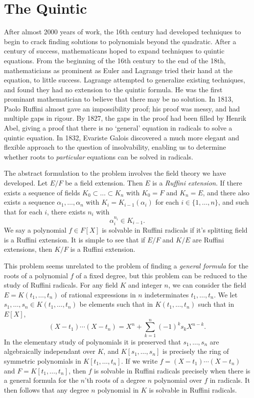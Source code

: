 \section{The Quintic}

After almost 2000 years of work, the 16th century had developed techniques to begin to crack finding solutions to polynomials beyond the quadratic. After a century of success, mathematicans hoped to expand techniques to quintic equations. From the beginning of the 16th century to the end of the 18th, mathematicians as prominent as Euler and Lagrange tried their hand at the equation, to little success. Lagrange attempted to generalize existing techniques, and found they had no extension to the quintic formula. He was the first prominant mathematician to believe that there may be no solution. In 1813, Paolo Ruffini almost gave an impossibility proof; his proof was messy, and had multiple gaps in rigour. By 1827, the gaps in the proof had been filled by Henrik Abel, giving a proof that there is no `general' equation in radicals to solve a quintic equation. In 1832, Evariste Galois discovered a much more elegant and flexible approach to the question of insolvability, enabling us to determine whether roots to \emph{particular} equations can be solved in radicals.

The abstract formulation to the problem involves the field theory we have developed. Let $E/F$ be a field extension. Then $E$ is a \emph{Ruffini extension}. If there exists a sequence of fields $K_0 \subset \dots \subset K_n$ with $K_0 = F$ and $K_n = E$, and there also exists a sequence $\alpha_1,\dots,\alpha_n$ with $K_i = K_{i-1}(\alpha_i)$ for each $i \in \{ 1, \dots, n \}$, and such that for each $i$, there exists $n_i$ with
%
\[ \alpha_i^{n_i} \in K_{i-1}. \]
%
We say a polynomial $f \in F[X]$ is solvable in Ruffini radicals if it's splitting field is a Ruffini extension. It is simple to see that if $E/F$ and $K/E$ are Ruffini extensions, then $K/F$ is a Ruffini extension.

This problem seems unrelated to the problem of finding a \emph{general formula} for the roots of a polynomial $f$ of a fixed degree, but this problem can be reduced to the study of Ruffini radicals. For any field $K$ and integer $n$, we can consider the field $E = K(t_1,\dots,t_n)$ of rational expressions in $n$ indeterminates $t_1,\dots,t_n$. We let $s_1,\dots,s_n \in K(t_1,\dots,t_n)$ be elements such that in $K(t_1,\dots,t_n)$ such that in $E[X]$,
%
\[ (X - t_1) \cdots (X - t_n) = X^n + \sum_{k = 1}^n (-1)^k s_k X^{n-k}. \]
%
In the elementary study of polynomials it is preserved that $s_1,\dots,s_n$ are algebraically independant over $K$, and $K[s_1,\dots,s_n]$ is precisely the ring of symmetric polynomials in $K[t_1,\dots,t_n]$. If we write $f = (X - t_1) \cdots (X - t_n)$ and $F = K[t_1,\dots,t_n]$, then $f$ is solvable in Ruffini radicals precisely when there is a general formula for the $n$'th roots of a degree $n$ polynomial over $f$ in radicals. It then follows that any degree $n$ polynomial in $K$ is solvable in Ruffini radicals.

